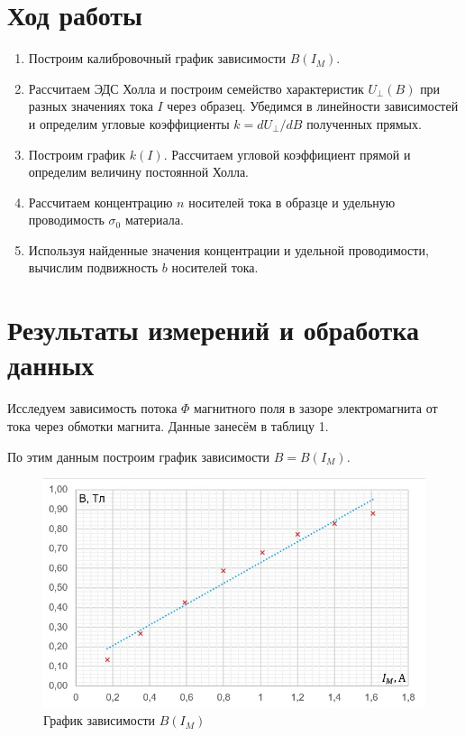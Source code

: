 \documentclass[a4paper]{article}
\theoremstyle{definition}
\theoremstyle{remark}
\begin{document}
\section{Ход работы}

\begin{enumerate}
    \item Построим калибровочный график зависимости $B(I_M)$.
    \item Рассчитаем ЭДС Холла и построим семейство характеристик $U_{\bot}(B)$ при разных значениях тока $I$ через образец. Убедимся в линейности зависимостей и определим угловые коэффициенты $k = dU_{\bot} / dB$ полученных прямых.
    \item Построим график $k(I)$. Рассчитаем угловой коэффициент прямой и определим величину постоянной Холла.
    \item Рассчитаем концентрацию $n$ носителей тока в образце и удельную проводимость $\sigma_0$ материала.
    \item Используя найденные значения концентрации и удельной проводимости, вычислим подвижность $b$ носителей тока.
\end{enumerate}

\section{Результаты измерений и обработка данных}

    Исследуем зависимость потока $\Phi$ магнитного поля в зазоре электромагнита от тока через обмотки магнита. Данные занесём в таблицу 1. \medskip

    По этим данным построим график зависимости $B = B(I_M)$.

    \begin{figure}[h!]
        \centering
        \includegraphics[width = 320pt]{image/graph1.jpg}
        \caption{График зависимости $B(I_M)$}
    \end{figure}
\end{document}
